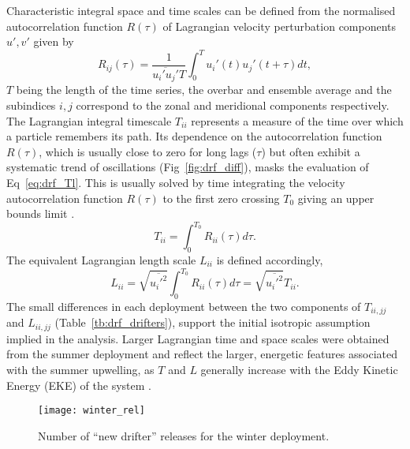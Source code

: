 Characteristic integral space and time scales can be defined from
the normalised autocorrelation function $R(\tau)$ of Lagrangian
velocity perturbation components $u',v'$ given by
\begin{equation}\label{eq:drf_R}
   R_{ij}(\tau) = \frac{1}{\overline{u_i'u_j'}T} \int^{T}_0
   u_i'(t)u_j'(t+\tau)dt,
\end{equation}
$T$ being the length of the time series, the overbar and ensemble
average and the subindices $i,j$ correspond to the zonal and
meridional components respectively. The Lagrangian integral
timescale $T_{ii}$ represents a measure of the time over which a
particle remembers its path. Its dependence on the autocorrelation
function $R(\tau)$, which is usually close to zero for long lags
($\tau$) but often exhibit a systematic trend of oscillations
(Fig~\ref{fig:drf_diff}), masks the evaluation of
Eq~\ref{eq:drf_Tl}. This is usually solved by time integrating the
velocity autocorrelation function $R(\tau)$ to the first zero
crossing $T_0$ giving an upper bounds limit \citep{Poulain89}.
\begin{equation}\label{eq:drf_Tl}
   T_{ii} = \int^{T_0}_0 R_{ii}(\tau)d\tau.
\end{equation}
The equivalent Lagrangian length scale $L_{ii}$ is defined
accordingly,
\begin{equation}\label{eq:drf_Ll}
   L_{ii} = \sqrt{\overline{u_i'^2}} \int^{T_0}_0
   R_{ii}(\tau)d\tau = \sqrt{\overline{u_i'^2}}T_{ii}.
\end{equation}
The small differences in each deployment between the two
components of $T_{ii,jj}$ and $L_{ii,jj}$
(Table~\ref{tb:drf_drifters}), support the initial isotropic
assumption implied in the analysis. Larger Lagrangian time and
space scales were obtained from the summer deployment and reflect
the larger, energetic features associated with the summer
upwelling, as $T$ and $L$ generally increase with the Eddy Kinetic
Energy (EKE) of the system \citep[i.e.][]{Martins02}.
\begin{figure}
\centering %
\texttt{[image: winter\_rel]}%
\caption{Number of ``new drifter'' releases for the winter
deployment. }
\label{fig:drf_releases}%
\end{figure}

